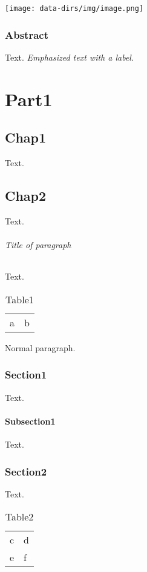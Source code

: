 \documentclass[a4paper,11pt]{book}
\title{}
\author{}
\date{}
\begin{document}
\setcounter{tocdepth}{0}
\tableofcontents
\texttt{[image: data-dirs/img/image.png]}

\section*{Abstract}
\label{s:1}
Text.
\hypertarget{label1}{}\emph{Emphasized text with a label}.

\part{Part1}
\label{s:2}
\setcounter{tocdepth}{0}
\minitoc
\chapter{Chap1}
\label{s:3}
Text.

\chapter{Chap2}
\label{s:4}
\setcounter{tocdepth}{3}
\minitoc
Text.

\paragraph{Title of paragraph}
Text.
\begin{table}[htbp]
\begin{tabular}{ll}
a & b \\
\end{tabular}
\caption{Table1}
\label{tbl:1}
\end{table}

Normal paragraph.

\section{Section1}
\label{s:5}
Text.

\subsection{Subsection1}
\label{s:6}
Text.

\section{Section2}
\label{s:7}
Text.
\begin{table}[htbp]
\begin{tabular}{ll}
c & d \\
e & f \\
\end{tabular}
\caption{Table2}
\label{tbl:2}
\end{table}
\end{document}
